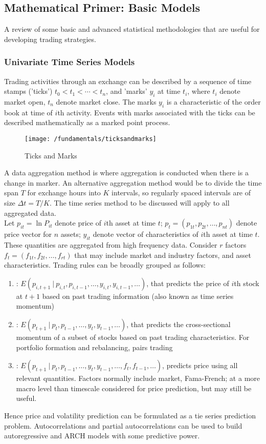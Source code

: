 \subsection{Mathematical Primer: Basic Models}

A review of some basic and advanced statistical methodologies that are useful for developing trading strategies.

\subsubsection{Univariate Time Series Models}

Trading activities through an exchange can be described by a sequence of time stamps ('ticks') $t_0 < t_1 < \cdots < t_n$, and 'marks' $y_i$ at time $t_i$, where $t_i$ denote market open, $t_n$ denote market close. The marks $y_i$ is a characteristic of the order book at time of $i$th activity. Events with marks associated with the ticks can be described mathematically as a marked point process.
\begin{figure}[H]
\centering
\texttt{[image: /fundamentals/ticksandmarks]}
\caption{Ticks and Marks}
\end{figure}

A data aggregation method is where aggregation is conducted when there is a change in marker. An alternative aggregation method would be to divide the time span $T$ for exchange hours into $K$ intervals, so regularly spaced intervals are of size $\Delta t = T/K$. The time series method to be discussed will apply to all aggregated data.\\

Let $p_{it} = \ln P_{it}$ denote price of $i$th asset at time $t$; $p_t = (p_{1t}, p_{2t}, \ldots, p_{nt})$ denote price vector for $n$ assets; $y_{it}$ denote vector of characteristics of $i$th asset at time $t$. These quantities are aggregated from high frequency data. Consider $r$ factors $f_t = (f_{1t}, f_{2t}, \ldots, f_{rt})$ that may include market and industry factors, and asset characteristics. Trading rules can be broadly grouped as follows:
\begin{enumerate}[label=\roman*.]
\setlength{\itemsep}{0pt}
\item {}: $E(p_{i, t+1} \ \vert \ p_{i,t}, p_{i, t-1}, \ldots, y_{i,t}, y_{i, t-1}, \ldots)$, that predicts the price of $i$th stock at $t+1$ based on past trading information (also known as time series momentum)
\item {}: $E(p_{t+1} \ \vert \ p_t, p_{t-1}, \ldots, y_t, y_{t-1}, \ldots)$, that predicts the cross-sectional momentum of a subset of stocks based on past trading characteristics. For portfolio formation and rebalancing, pairs trading
\item {}: $E(p_{t+1} \ \vert \ p_{t}, p_{t-1}, \ldots, y_t, y_{t-1}, \ldots, f_t, f_{t-1}, \ldots)$, predicts price using all relevant quantities. Factors normally include market, Fama-French; at a more macro level than timescale considered for price prediction, but may still be useful.
\end{enumerate}

Hence price and volatility prediction can be formulated as a tie series prediction problem. Autocorrelations and partial autocorrelations can be used to build autoregressive and ARCH models with some predictive power.


